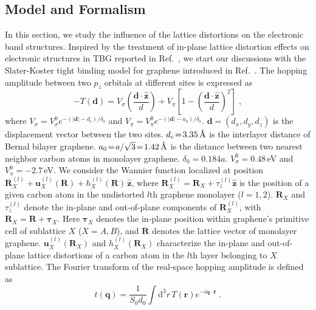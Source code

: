 \documentclass[aps,prx,10pt,twocolumn,superscriptaddress]{revtex4}
\def\angstrom{\mbox{\normalfont\AA}}
\def\angstrom{\mbox{\normalfont\AA}}
\begin{document}
\subsection{Model and Formalism}
\label{sec:bands}
In this section, we study the influence of the lattice distortions on the electronic band structures. 
Inspired by the treatment of in-plane lattice distortion effects on electronic structures in TBG reported in Ref.~, we start our discussions with the Slater-Koster tight binding model for graphene introduced in Ref.~. The hopping amplitude between two $p_{z}$ orbitals at different sites  is expressed as \cite{moon-tbg-prb13}
\begin{equation}
-T(\textbf{d})=V_{\sigma}\left(\frac{\textbf{d}\cdot\hat{\textbf{z}}}{d}\right)+V_{\pi}\left[1-\left(\frac{\textbf{d}\cdot\hat{\textbf{z}}}{d}\right)^{2}\right]\;,
\label{eq:sk-hopping}
\end{equation}
where $V_{\sigma}\!=\!V^{0}_{\sigma}e^{-(\left|\textbf{d}\right|-d_{c})/\delta_{0}}$ and $V_{\pi}\!=\!V^{0}_{\pi}e^{-(\left|\textbf{d}\right|-a_{0})/\delta_{0}}$. $\textbf{d}\!=\!(d_{x},d_{y},d_{z})$ is the displacement vector between the two sites. $d_{c}\!=\!3.35\,\angstrom$ is the interlayer distance of Bernal bilayer graphene. $a_{0}\!=\!a/\sqrt{3}\!=\!1.42\,\angstrom$ is the distance between two nearest neighbor carbon atoms in monolayer graphene. $\delta_{0}\!=\!0.184a$. $V^{0}_{\sigma}\!=\!0.48$\,eV and $V^{0}_{\pi}=-2.7\,$eV. We consider the Wannier function localized at position $\textbf{R}^{(l)}_{X}+\textbf{u}^{(l)}_{X}(\textbf{R})+h^{(l)}_{X}(\textbf{R})\,\hat{\mathbf{z}}$, where $\textbf{R}^{(l)}_X=\mathbf{R}_X + \tau_z^{(l)}\hat{\mathbf{z}}$ is the position of a given carbon atom in the undistorted $l$th  graphene monolayer ($l=1, 2$). $\textbf{R}_X$ and $\tau_z^{(l)}$ denote the in-plane and out-of-plane components of $\textbf{R}^{(l)}_X$,  with $\mathbf{R}_X=\mathbf{R}+\bm{\tau}_X$. 
Here $\bm{\tau}_X$ denotes the in-plane  position within graphene's primitive cell of sublattice $X$ ($X\!=\!A, B$), and $\mathbf{R}$ denotes the lattice vector of monolayer graphene. $\textbf{u}^{(l)}_{X}(\textbf{R}_X)$ and $h^{(l)}_{X}(\textbf{R}_X)$ characterize the in-plane and out-of-plane lattice distortions of a carbon atom in the $l$th layer  belonging to $X$ sublattice. The Fourier transform of the real-space hopping amplitude is defined as 
\begin{equation}
t(\textbf{q})=\frac{1}{S_{0}d_{0}}\int\mathrm{d}^{3}r\,T(\textbf{r})e^{-i\textbf{q}\cdot\textbf{r}}\;.
\label{eq:tq}
\end{equation}
\end{document}
